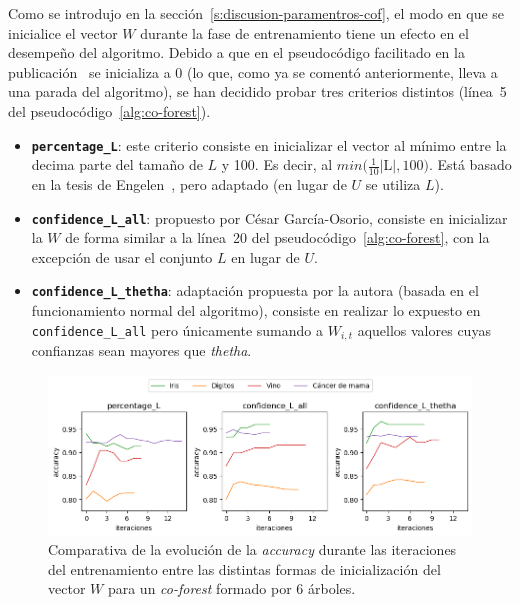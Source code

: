 Como se introdujo en la sección~\ref{s:discusion-paramentros-cof}, el modo en que se inicialice el vector $W$ durante la fase de entrenamiento tiene un efecto en el desempeño del algoritmo. Debido a que en el pseudocódigo facilitado en la publicación~\cite{originalCoForest2007} se inicializa a 0 (lo que, como ya se comentó anteriormente, lleva a una parada del algoritmo), se han decidido probar tres criterios distintos (línea~5 del pseudocódigo~\ref{alg:co-forest}).

\begin{itemize}
	\item \textbf{\texttt{percentage\_L}}: este criterio consiste en inicializar el vector al mínimo entre la decima parte del tamaño de $L$ y 100. Es decir, al $min(\frac{1}{10}|$L$|, 100)$. Está basado en la tesis de Engelen~\cite{engelen2018thesis}, pero adaptado (en lugar de $U$ se utiliza $L$).
	\item \textbf{\texttt{confidence\_L\_all}}: propuesto por César García-Osorio, consiste en inicializar la $W$ de forma similar a la línea~20 del pseudocódigo~\ref{alg:co-forest}, con la excepción de usar el conjunto $L$ en lugar de $U$.
	\item \textbf{\texttt{confidence\_L\_thetha}}: adaptación propuesta por la autora (basada en el funcionamiento normal del algoritmo), consiste en realizar lo expuesto en \texttt{confidence\_L\_all} pero únicamente sumando a $W_{i,t}$ aquellos valores cuyas confianzas sean mayores que \textit{thetha}.
\end{itemize}

\begin{figure}[h]
	\caption[\textit{Co-Forest}: resultados (inicialización $W$ con 6 árboles)]{Comparativa de la evolución de la \textit{accuracy} durante las iteraciones del entrenamiento entre las distintas formas de inicialización del vector $W$ para un \textit{co-forest} formado por 6 árboles.}
	\label{img:w_init-6-trees}
	\centering
	\includegraphics[width=\textwidth]{../img/memoria/5_coforest_w-init_rd5_n6}
\end{figure}

